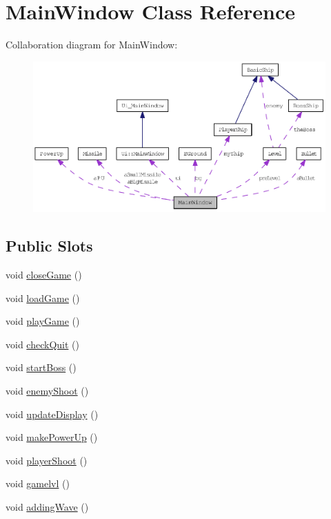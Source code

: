 \hypertarget{class_main_window}{
\section{MainWindow Class Reference}
\label{class_main_window}
}
Collaboration diagram for MainWindow:\nopagebreak
\begin{figure}[H]
\begin{center}
\leavevmode
\includegraphics[width=400pt]{class_main_window__coll__graph}
\end{center}
\end{figure}
\subsection*{Public Slots}
\begin{DoxyCompactItemize}
\item 
void \hyperlink{class_main_window_a57a17b24a0c1a25ea3f2575febfa2daa}{closeGame} ()
\item 
void \hyperlink{class_main_window_af32531cf9be0011b3b3aa9cb1c159633}{loadGame} ()
\item 
void \hyperlink{class_main_window_a400071005bde6fee0623aafdb071ba89}{playGame} ()
\item 
void \hyperlink{class_main_window_af5fe3a1a1b28d5a77f91ffb2ca755dc9}{checkQuit} ()
\item 
void \hyperlink{class_main_window_addd77660e768b2eedb30c34815e9f1ab}{startBoss} ()
\item 
void \hyperlink{class_main_window_ac609f6dbbde76c9bc720a36aac05b633}{enemyShoot} ()
\item 
void \hyperlink{class_main_window_a260413ba6ca75a0e6164fdbd667afd58}{updateDisplay} ()
\item 
void \hyperlink{class_main_window_afa51f8b618e297e7b2ed6e9d1bfd38d7}{makePowerUp} ()
\item 
void \hyperlink{class_main_window_a82a6ee47ad6e73ab2eb6816ee6324708}{playerShoot} ()
\item 
void \hyperlink{class_main_window_a18edf6e25d25b890fb889dae523d45f9}{gamelvl} ()
\item 
void \hyperlink{class_main_window_aa5e6f6d450a8cca11ebe714ac36146b0}{addingWave} ()
\end{DoxyCompactItemize}
